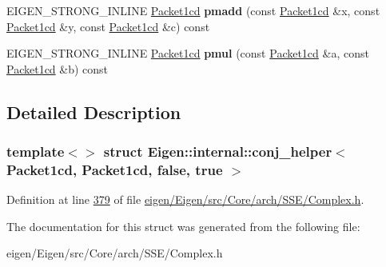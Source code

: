 \begin{DoxyCompactItemize}
E\+I\+G\+E\+N\+\_\+\+S\+T\+R\+O\+N\+G\+\_\+\+I\+N\+L\+I\+NE \hyperlink{struct_eigen_1_1internal_1_1_packet1cd}{Packet1cd} {\bfseries pmadd} (const \hyperlink{struct_eigen_1_1internal_1_1_packet1cd}{Packet1cd} \&x, const \hyperlink{struct_eigen_1_1internal_1_1_packet1cd}{Packet1cd} \&y, const \hyperlink{struct_eigen_1_1internal_1_1_packet1cd}{Packet1cd} \&c) const
\item 
\mbox{\label{struct_eigen_1_1internal_1_1conj__helper_3_01_packet1cd_00_01_packet1cd_00_01false_00_01true_01_4_a077ec7bf6ea716ab78494320e7a6e085}} 
E\+I\+G\+E\+N\+\_\+\+S\+T\+R\+O\+N\+G\+\_\+\+I\+N\+L\+I\+NE \hyperlink{struct_eigen_1_1internal_1_1_packet1cd}{Packet1cd} {\bfseries pmul} (const \hyperlink{struct_eigen_1_1internal_1_1_packet1cd}{Packet1cd} \&a, const \hyperlink{struct_eigen_1_1internal_1_1_packet1cd}{Packet1cd} \&b) const
\end{DoxyCompactItemize}


\subsection{Detailed Description}
\subsubsection*{template$<$$>$\newline
struct Eigen\+::internal\+::conj\+\_\+helper$<$ Packet1cd, Packet1cd, false, true $>$}



Definition at line \hyperlink{eigen_2_eigen_2src_2_core_2arch_2_s_s_e_2_complex_8h_source_l00379}{379} of file \hyperlink{eigen_2_eigen_2src_2_core_2arch_2_s_s_e_2_complex_8h_source}{eigen/\+Eigen/src/\+Core/arch/\+S\+S\+E/\+Complex.\+h}.



The documentation for this struct was generated from the following file\+:\begin{DoxyCompactItemize}
\item 
eigen/\+Eigen/src/\+Core/arch/\+S\+S\+E/\+Complex.\+h\end{DoxyCompactItemize}
